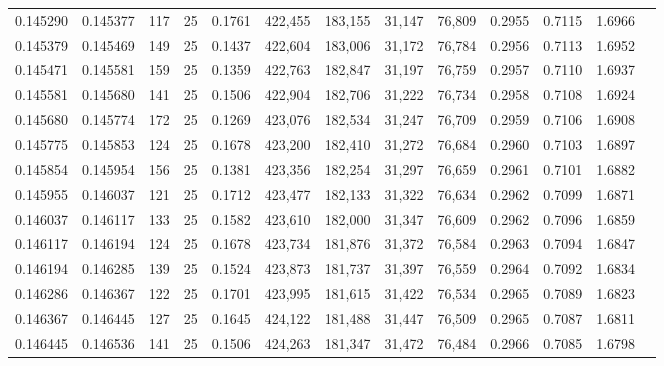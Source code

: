\begin{tabular}{rrrrrrrrrrrrr}
0.145290 & 0.145377 &   117 &  25 &                                     0.1761 & 422,455 & 183,155 &  31,147 &  76,809 & 0.2955 & 0.7115 & 1.6966 \\
0.145379 & 0.145469 &   149 &  25 &                                     0.1437 & 422,604 & 183,006 &  31,172 &  76,784 & 0.2956 & 0.7113 & 1.6952 \\
0.145471 & 0.145581 &   159 &  25 &                                     0.1359 & 422,763 & 182,847 &  31,197 &  76,759 & 0.2957 & 0.7110 & 1.6937 \\
0.145581 & 0.145680 &   141 &  25 &                                     0.1506 & 422,904 & 182,706 &  31,222 &  76,734 & 0.2958 & 0.7108 & 1.6924 \\
0.145680 & 0.145774 &   172 &  25 &                                     0.1269 & 423,076 & 182,534 &  31,247 &  76,709 & 0.2959 & 0.7106 & 1.6908 \\
0.145775 & 0.145853 &   124 &  25 &                                     0.1678 & 423,200 & 182,410 &  31,272 &  76,684 & 0.2960 & 0.7103 & 1.6897 \\
0.145854 & 0.145954 &   156 &  25 &                                     0.1381 & 423,356 & 182,254 &  31,297 &  76,659 & 0.2961 & 0.7101 & 1.6882 \\
0.145955 & 0.146037 &   121 &  25 &                                     0.1712 & 423,477 & 182,133 &  31,322 &  76,634 & 0.2962 & 0.7099 & 1.6871 \\
0.146037 & 0.146117 &   133 &  25 &                                     0.1582 & 423,610 & 182,000 &  31,347 &  76,609 & 0.2962 & 0.7096 & 1.6859 \\
0.146117 & 0.146194 &   124 &  25 &                                     0.1678 & 423,734 & 181,876 &  31,372 &  76,584 & 0.2963 & 0.7094 & 1.6847 \\
0.146194 & 0.146285 &   139 &  25 &                                     0.1524 & 423,873 & 181,737 &  31,397 &  76,559 & 0.2964 & 0.7092 & 1.6834 \\
0.146286 & 0.146367 &   122 &  25 &                                     0.1701 & 423,995 & 181,615 &  31,422 &  76,534 & 0.2965 & 0.7089 & 1.6823 \\
0.146367 & 0.146445 &   127 &  25 &                                     0.1645 & 424,122 & 181,488 &  31,447 &  76,509 & 0.2965 & 0.7087 & 1.6811 \\
0.146445 & 0.146536 &   141 &  25 &                                     0.1506 & 424,263 & 181,347 &  31,472 &  76,484 & 0.2966 & 0.7085 & 1.6798 \\

\end{tabular}
